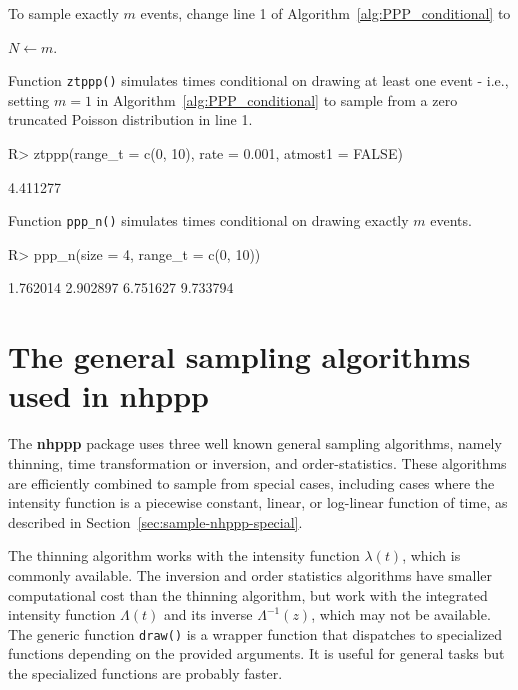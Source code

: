 \documentclass[10pt,letterpaper]{article}
\newcommand{\pkg}[1]{{\bf #1}}
\newcommand{\fct}[1]{\texttt{#1()}}
\begin{document}
To sample exactly $m$ events, change line 1 of Algorithm~\ref{alg:PPP_conditional} to
\begin{center}
$N \gets m$.
\end{center}

Function \fct{ztppp} simulates times conditional on drawing at least one event - i.e., setting $m=1$ in Algorithm~\ref{alg:PPP_conditional} to sample from a zero truncated Poisson distribution in line 1.
\begin{Schunk}
\begin{Sinput}
R> ztppp(range_t = c(0, 10), rate = 0.001, atmost1 = FALSE)
\end{Sinput}
\begin{Soutput}
[1] 4.411277
\end{Soutput}
\end{Schunk}

Function \fct{ppp\_n} simulates times conditional on drawing exactly $m$ events.
\begin{Schunk}
\begin{Sinput}
R> ppp_n(size = 4, range_t = c(0, 10))
\end{Sinput}
\begin{Soutput}
[1] 1.762014 2.902897 6.751627 9.733794
\end{Soutput}
\end{Schunk}

\section[The general sampling algorithms used in nhppp]{The general sampling algorithms used in \pkg{nhppp}}\label{sec:general-sampling}

The \pkg{nhppp} package uses three well known general sampling algorithms, namely thinning, time transformation or inversion, and order-statistics. These algorithms are efficiently combined to sample from special cases, including cases where the intensity function is a piecewise constant, linear, or log-linear function of time, as described in Section~\ref{sec:sample-nhppp-special}.

The thinning algorithm works with the intensity function $\lambda(t)$, which is commonly available. The inversion and order statistics algorithms have smaller computational cost than the thinning algorithm, but work with the integrated intensity function $\Lambda(t)$ and its inverse $\Lambda^{-1}(z)$, which may not be available. The generic function \fct{draw} is a wrapper function that dispatches to specialized functions depending on the provided arguments. It is useful for general tasks but the specialized functions are probably faster.
\end{document}
